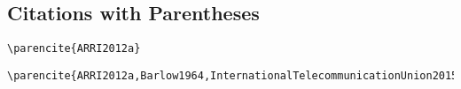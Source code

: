 \textcite{ARRI2012a,Barlow1964,InternationalTelecommunicationUnion2015i,Long2014}

\subsection*{Citations with Parentheses}%
\label{subsec:citations-with-parentheses}

\begin{lstlisting}[caption={Citation with Parentheses for Single Author.}]
\parencite{ARRI2012a}
\end{lstlisting}

\parencite{ARRI2012a}

\begin{lstlisting}[caption={Citation with Parentheses for Multiple Authors.}s]
\parencite{ARRI2012a,Barlow1964,InternationalTelecommunicationUnion2015i,Long2014}
\end{lstlisting}

\parencite{ARRI2012a,Barlow1964,InternationalTelecommunicationUnion2015i,Long2014}
